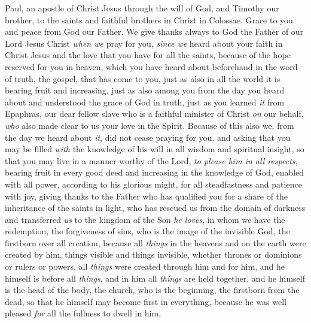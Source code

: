 
\begin{biblechapter} %
 Paul, an apostle of Christ Jesus through the will of God, and Timothy our brother,
\verse to the saints and faithful brothers in Christ in Colossae. Grace to you and peace from God our Father.
 We give thanks always to God the Father of our Lord Jesus Christ \textit{when we} pray for you,
\verse \textit{since we} heard about your faith in Christ Jesus and the love that you have for all the saints,
\verse because of the hope reserved for you in heaven, which you have heard about beforehand in the word of truth, the gospel,
\verse that has come to you, just as also in all the world it is bearing fruit and increasing, just as also among you from the day you heard about and understood the grace of God in truth,
\verse just as you learned \textit{it} from Epaphras, our dear fellow slave who is a faithful minister of Christ \textit{on} our behalf,
\verse \textit{who} also made clear to us your love in the Spirit.
 Because of this also we, from the day we heard about \textit{it}, did not cease praying for you, and asking that you may be filled \textit{with} the knowledge of his will in all wisdom and spiritual insight,
\verse so that you may live in a manner worthy of the Lord, \textit{to please \textit{him} in all respects}, bearing fruit in every good deed and increasing in the knowledge of God,
\verse enabled with all power, according to his glorious might, for all steadfastness and patience with joy,
\verse giving thanks to the Father who has qualified you for a share of the inheritance of the saints in light,
\verse who has rescued us from the domain of darkness and transferred \textit{us} to the kingdom of the Son \textit{he loves},
\verse in whom we have the redemption, the forgiveness of sins,
\verse who is the image of the invisible God, the firstborn over all creation,
\verse because all \textit{things} in the heavens and on the earth were created by him, things visible and things invisible, whether thrones or dominions or rulers or powers, all \textit{things} were created through him and for him,
\verse and he himself is before all \textit{things}, and in him all \textit{things} are held together,
\verse and he himself is the head of the body, the church, who is the beginning, the firstborn from the dead, so that he himself may become first in everything,
\verse because he was well pleased \textit{for} all the fullness to dwell in him,

\end{biblechapter}
